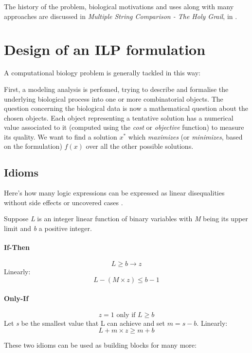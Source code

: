 The history of the problem, biological motivations and uses along with many approaches are discussed in \textit{Multiple String Comparison - The Holy Grail}, in \cite{Gusfield:1997:AST:262228}.

\section{Design of an ILP formulation}

A computational biology problem is generally tackled in this way:

First, a modeling analysis is perfomed, trying to describe and formalise the underlying biological process into one or more combinatorial objects. The question concerning the biological data is now a mathematical question about the chosen objects. Each object representing a tentative solution has a numerical value associated to it (computed using the \textit{cost} or \textit{objective} function) to measure its quality. We want to find a solution $x^*$ which \textit{maximizes} (or \textit{minimizes}, based on the formulation) $f(x)$ over all the other possible solutions.


\subsection{Idioms}

Here's how many logic expressions can be expressed as linear disequalities without side effects or uncovered cases \cite{gusfieldilp}.

Suppose \textit{L} is an integer linear function of binary variables with \textit{M} being its upper limit and \textit{b} a positive integer.

\paragraph{If-Then}

$$ L \geq b \rightarrow z$$
Linearly:
$$ L - (M \times z) \leq  b - 1$$


\paragraph{Only-If}

$$ \text{$z = 1$ only if $L \geq b$}$$
Let \textit{s} be the smallest value that L can achieve and set $m = s - b$. Linearly:
$$ L + m \times z \geq m + b$$

These two idioms can be used as building blocks for many more:

